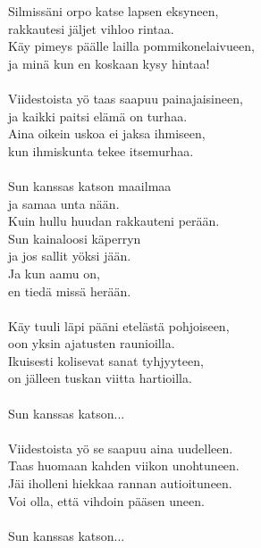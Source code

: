 
        Silmissäni orpo katse lapsen eksyneen, \\
        rakkautesi jäljet vihloo rintaa. \\
        Käy pimeys päälle lailla pommikonelaivueen, \\
        ja minä kun en koskaan kysy hintaa! \\
\hspace{10mm} \\
        Viidestoista yö taas saapuu painajaisineen, \\
        ja kaikki paitsi elämä on turhaa. \\
        Aina oikein uskoa ei jaksa ihmiseen, \\
        kun ihmiskunta tekee itsemurhaa. \\
\hspace{10mm} \\
        Sun kanssas katson maailmaa \\
        ja samaa unta nään. \\
        Kuin hullu huudan rakkauteni perään. \\
        Sun kainaloosi käperryn \\
        ja jos sallit yöksi jään. \\
        Ja kun aamu on, \\
        en tiedä missä herään. \\
\hspace{10mm} \\
        Käy tuuli läpi pääni etelästä pohjoiseen, \\
        oon yksin ajatusten raunioilla. \\
        Ikuisesti kolisevat sanat tyhjyyteen, \\
        on jälleen tuskan viitta hartioilla. \\
\hspace{10mm} \\
        Sun kanssas katson... \\
\hspace{10mm} \\
        Viidestoista yö se saapuu aina uudelleen. \\
        Taas huomaan kahden viikon unohtuneen. \\
        Jäi iholleni hiekkaa rannan autioituneen. \\
        Voi olla, että vihdoin pääsen uneen. \\
\hspace{10mm} \\
        Sun kanssas katson... \\
